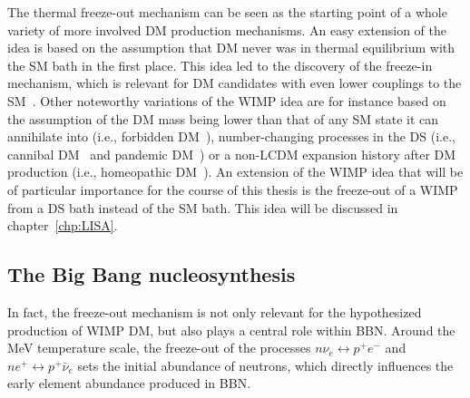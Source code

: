 The thermal freeze-out mechanism can be seen as the starting point of a whole variety of more involved \ac{DM} production mechanisms. An easy extension of the idea is based on the assumption that \ac{DM} never was in thermal equilibrium with the \ac{SM} bath in the first place. This idea led to the discovery of the freeze-in mechanism, which is relevant for \ac{DM} candidates with even lower couplings to the \ac{SM}~\cite{McDonald:1989jd, Hall:2009bx}.  Other noteworthy variations of the \ac{WIMP} idea are for instance based on the assumption of the \ac{DM} mass being lower than that of any \ac{SM} state it can annihilate into (i.e., forbidden \ac{DM}~\cite{Griest:1990kh, DAgnolo:2015ujb}), number-changing processes in the \ac{DS} (i.e., cannibal \ac{DM}~\cite{Dolgov:1980uu, Carlson:1992fn} and pandemic \ac{DM}~\cite{Bringmann:2021tjr}) or a non-\ac{LCDM} expansion history after \ac{DM} production (i.e., homeopathic \ac{DM}~\cite{Cirelli:2018iax, Kamionkowski:1990ni}). An extension of the \ac{WIMP} idea that will be of particular importance for the course of this thesis is the freeze-out of a \ac{WIMP} from a \ac{DS} bath instead of the \ac{SM} bath. This idea will be discussed in chapter~\ref{chp:LISA}.

\subsection{The Big Bang nucleosynthesis} \label{sec:BBN}

In fact, the freeze-out mechanism is not only relevant for the hypothesized production of \ac{WIMP} \ac{DM},  but also plays a central role within \ac{BBN}. Around the MeV temperature scale, the freeze-out of the processes $n\nu_e \leftrightarrow p^+e^-$ and $n e^+ \leftrightarrow p^+ \bar{\nu}_e$ sets the initial abundance of neutrons, which directly influences the early element abundance produced in \ac{BBN}. 

